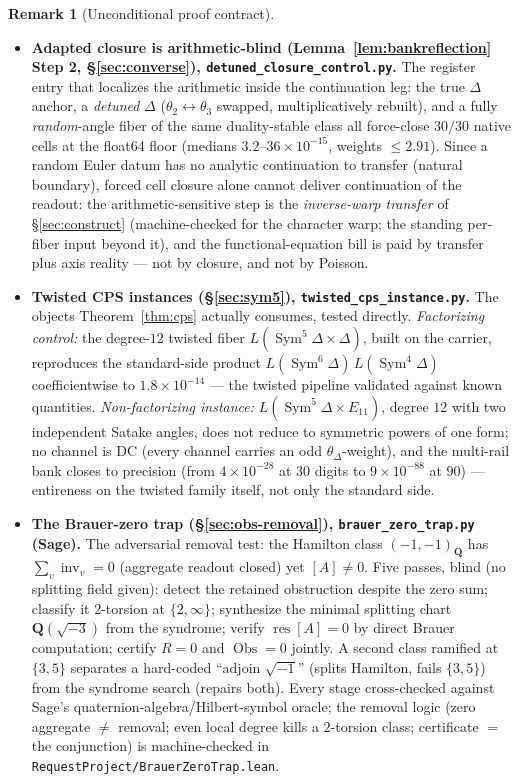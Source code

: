\documentclass[11pt]{article}
\theoremstyle{definition}
\newtheorem{remark}[theorem]{Remark}
\newcommand{\Sym}{\operatorname{Sym}}
\begin{document}
\begin{remark}[Unconditional proof contract]
\begin{enumerate}
\begin{itemize}
\item \textbf{Adapted closure is arithmetic-blind (Lemma~\ref{lem:bankreflection} Step 2,
\S\ref{sec:converse}), \texttt{detuned\_closure\_control.py}.} The register entry that localizes the
arithmetic inside the continuation leg: the true $\Delta$ anchor, a \emph{detuned} $\Delta$
($\theta_2\leftrightarrow\theta_3$ swapped, multiplicatively rebuilt), and a fully \emph{random}-angle fiber
of the same duality-stable class all force-close $30/30$ native cells at the float64 floor (medians
$3.2$--$36\times10^{-15}$, weights $\le2.91$). Since a random Euler datum has no analytic continuation to
transfer (natural boundary), forced cell closure alone cannot deliver continuation of the readout: the
arithmetic-sensitive step is the \emph{inverse-warp transfer} of \S\ref{sec:construct} (machine-checked for
the character warp; the standing per-fiber input beyond it), and the functional-equation bill is paid by
transfer plus axis reality --- not by closure, and not by Poisson.

\item \textbf{Twisted CPS instances (\S\ref{sec:sym5}), \texttt{twisted\_cps\_instance.py}.} The objects
Theorem~\ref{thm:cps} actually consumes, tested directly. \emph{Factorizing control:} the degree-$12$ twisted
fiber $L(\Sym^5\Delta\times\Delta)$, built on the carrier, reproduces the standard-side product
$L(\Sym^6\Delta)\,L(\Sym^4\Delta)$ coefficientwise to $1.8\times10^{-14}$ --- the twisted pipeline validated
against known quantities. \emph{Non-factorizing instance:} $L(\Sym^5\Delta\times E_{11})$, degree $12$ with two
independent Satake angles, does not reduce to symmetric powers of one form; no channel is DC (every channel
carries an odd $\theta_\Delta$-weight), and the multi-rail bank closes to precision (from $4\times10^{-28}$ at
$30$ digits to $9\times10^{-88}$ at $90$) --- entireness on the twisted family itself, not only the standard side.

\item \textbf{The Brauer-zero trap (\S\ref{sec:obs-removal}), \texttt{brauer\_zero\_trap.py} (Sage).} The
adversarial removal test: the Hamilton class $(-1,-1)_{\mathbf Q}$ has $\sum_v\operatorname{inv}_v=0$ (aggregate
readout closed) yet $[A]\neq0$. Five passes, blind (no splitting field given): detect the retained obstruction
despite the zero sum; classify it $2$-torsion at $\{2,\infty\}$; synthesize the minimal splitting chart
$\mathbf Q(\sqrt{-3})$ from the syndrome; verify $\operatorname{res}[A]=0$ by direct Brauer computation; certify
$R{=}0$ and $\operatorname{Obs}{=}0$ jointly. A second class ramified at $\{3,5\}$ separates a hard-coded
``adjoin $\sqrt{-1}$'' (splits Hamilton, fails $\{3,5\}$) from the syndrome search (repairs both). Every stage
cross-checked against Sage's quaternion-algebra/Hilbert-symbol oracle; the removal logic (zero aggregate $\ne$ removal; even local degree kills a $2$-torsion class; certificate $=$ the conjunction) is machine-checked in \texttt{RequestProject/BrauerZeroTrap.lean}.


\end{itemize}
\end{enumerate}
\end{remark}
\end{document}
